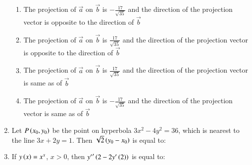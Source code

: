 \documentclass[journal,12pt,onecolumn]{IEEEtran}
\theoremstyle{remark}
\begin{document}
\begin{enumerate}
\hfill{}
\begin{enumerate}
\item The projection of $\vec{a}$ on $\vec{b}$ is $-\frac{17}{\sqrt{35}}$ and the direction of the projection vector is opposite to the direction of $\vec{b}$	
\item The projection of $\vec{a}$ on $\vec{b}$ is $\frac{17}{\sqrt{35}}$ and the direction of the projection vector is opposite to the direction of $\vec{b}$
\item The projection of $\vec{a}$ on $\vec{b}$ is $\frac{17}{\sqrt{35}}$ and the direction of the projection vector is same as of $\vec{b}$ 
\item The projection of $\vec{a}$ on $\vec{b}$ is $-\frac{17}{\sqrt{35}}$ and the direction of the projection vector is same as of $\vec{b}$
\end{enumerate}

\item Let $P\left(x_0,y_0\right)$ be the point on hyperbola $3x^2-4y^2=36$, which is nearest to the line $3x+2y=1$. Then $\sqrt{2}\left(y_0-x_0\right)$ is equal to:
\hfill{}
\begin{enumerate}
\end{enumerate}

\item If $y\left(x\right)=x^x$, $x>0$, then ${y^\prime}^\prime\left(2-2y^\prime\left(2\right)\right)$ is equal to:

\hfill{}
\begin{enumerate}
\end{enumerate}
\end{enumerate}
\end{document}
